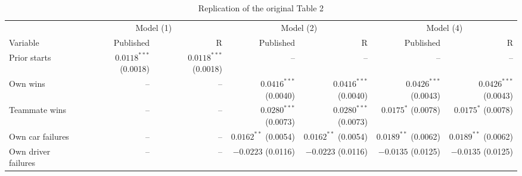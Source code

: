 \begin{table}[!htbp]
\centering
\caption{Replication of the original Table 2}
\label{tab:replication}
\fontsize{8.5}{10}\selectfont
\setlength{\tabcolsep}{3pt}
\renewcommand{\arraystretch}{1.10}
\begin{tabular*}{\linewidth}{@{\extracolsep{\fill}}lrrrrrr@{}}
\toprule
 & \multicolumn{2}{c}{Model (1)} & \multicolumn{2}{c}{Model (2)} & \multicolumn{2}{c}{Model (4)} \\
\cmidrule(lr){2-3}\cmidrule(lr){4-5}\cmidrule(l){6-7}
Variable & Published & R & Published & R & Published & R \\
\midrule
Prior starts & \shortstack[r]{$0.0118^{***}$\\{\scriptsize (0.0018)}} & \shortstack[r]{$0.0118^{***}$\\{\scriptsize (0.0018)}} & {--} & {--} & {--} & {--} \\
Own wins & {--} & {--} & \shortstack[r]{$0.0416^{***}$\\{\scriptsize (0.0040)}} & \shortstack[r]{$0.0416^{***}$\\{\scriptsize (0.0040)}} & \shortstack[r]{$0.0426^{***}$\\{\scriptsize (0.0043)}} & \shortstack[r]{$0.0426^{***}$\\{\scriptsize (0.0043)}} \\
Teammate wins & {--} & {--} & \shortstack[r]{$0.0280^{***}$\\{\scriptsize (0.0073)}} & \shortstack[r]{$0.0280^{***}$\\{\scriptsize (0.0073)}} & \shortstack[r]{$0.0175^{*}$\\{\scriptsize (0.0078)}} & \shortstack[r]{$0.0175^{*}$\\{\scriptsize (0.0078)}} \\
Own car failures & {--} & {--} & \shortstack[r]{$0.0162^{**}$\\{\scriptsize (0.0054)}} & \shortstack[r]{$0.0162^{**}$\\{\scriptsize (0.0054)}} & \shortstack[r]{$0.0189^{**}$\\{\scriptsize (0.0062)}} & \shortstack[r]{$0.0189^{**}$\\{\scriptsize (0.0062)}} \\
Own driver failures & {--} & {--} & \shortstack[r]{$-0.0223$\\{\scriptsize (0.0116)}} & \shortstack[r]{$-0.0223$\\{\scriptsize (0.0116)}} & \shortstack[r]{$-0.0135$\\{\scriptsize (0.0125)}} & \shortstack[r]{$-0.0135$\\{\scriptsize (0.0125)}} \\

\end{tabular*}
\end{table}
